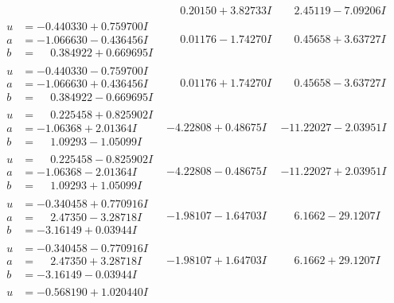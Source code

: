 \documentclass[1p]{elsarticle_modified}
\theoremstyle{definition}
\begin{document}
$$\begin{array}{c|c|c}
 & \phantom{-}0.20150 + 3.82733 I & \phantom{-}2.45119 - 7.09206 I \\ \hline\begin{aligned}
u &= -0.440330 + 0.759700 I \\
a &= -1.066630 - 0.436456 I \\
b &= \phantom{-}0.384922 + 0.669695 I\end{aligned}
 & \phantom{-}0.01176 - 1.74270 I & \phantom{-}0.45658 + 3.63727 I \\ \hline\begin{aligned}
u &= -0.440330 - 0.759700 I \\
a &= -1.066630 + 0.436456 I \\
b &= \phantom{-}0.384922 - 0.669695 I\end{aligned}
 & \phantom{-}0.01176 + 1.74270 I & \phantom{-}0.45658 - 3.63727 I \\ \hline\begin{aligned}
u &= \phantom{-}0.225458 + 0.825902 I \\
a &= -1.06368 + 2.01364 I \\
b &= \phantom{-}1.09293 - 1.05099 I\end{aligned}
 & -4.22808 + 0.48675 I & -11.22027 - 2.03951 I \\ \hline\begin{aligned}
u &= \phantom{-}0.225458 - 0.825902 I \\
a &= -1.06368 - 2.01364 I \\
b &= \phantom{-}1.09293 + 1.05099 I\end{aligned}
 & -4.22808 - 0.48675 I & -11.22027 + 2.03951 I \\ \hline\begin{aligned}
u &= -0.340458 + 0.770916 I \\
a &= \phantom{-}2.47350 - 3.28718 I \\
b &= -3.16149 + 0.03944 I\end{aligned}
 & -1.98107 - 1.64703 I & \phantom{-}6.1662 - 29.1207 I \\ \hline\begin{aligned}
u &= -0.340458 - 0.770916 I \\
a &= \phantom{-}2.47350 + 3.28718 I \\
b &= -3.16149 - 0.03944 I\end{aligned}
 & -1.98107 + 1.64703 I & \phantom{-}6.1662 + 29.1207 I \\ \hline\begin{aligned}
u &= -0.568190 + 1.020440 I \\

\end{aligned}
\end{array}$$
\end{document}
